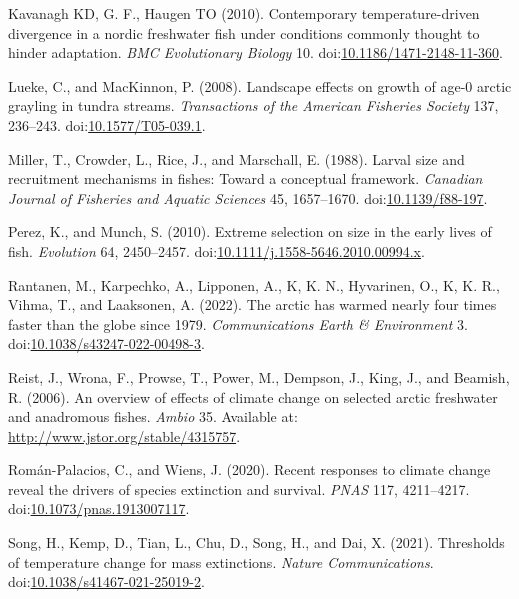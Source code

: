 \documentclass[utf8]{frontiersSCNS}
\newlength{\cslhangindent}
\newlength{\cslentryspacingunit} %
\newenvironment{CSLReferences}[2] %
 {%
  \setlength{\parindent}{0pt}
  \ifodd #1
  \let\oldpar\par
  \def\par{\hangindent=\cslhangindent\oldpar}
  \fi
  \setlength{\parskip}{#2\cslentryspacingunit}
 }%
 {}
\begin{document}
\begin{CSLReferences}{1}{0}
\leavevmode{}%
Kavanagh KD, G. F., Haugen TO (2010). Contemporary temperature-driven
divergence in a nordic freshwater fish under conditions commonly thought
to hinder adaptation. \emph{BMC Evolutionary Biology} 10.
doi:\href{https://doi.org/10.1186/1471-2148-11-360}{10.1186/1471-2148-11-360}.

\leavevmode{}%
Lueke, C., and MacKinnon, P. (2008). Landscape effects on growth of
age-0 arctic grayling in tundra streams. \emph{Transactions of the
American Fisheries Society} 137, 236--243.
doi:\href{https://doi.org/10.1577/T05-039.1}{10.1577/T05-039.1}.

\leavevmode{}%
Miller, T., Crowder, L., Rice, J., and Marschall, E. (1988). Larval size
and recruitment mechanisms in fishes: Toward a conceptual framework.
\emph{Canadian Journal of Fisheries and Aquatic Sciences} 45,
1657--1670. doi:\href{https://doi.org/10.1139/f88-197}{10.1139/f88-197}.

\leavevmode{}%
Perez, K., and Munch, S. (2010). Extreme selection on size in the early
lives of fish. \emph{Evolution} 64, 2450--2457.
doi:\href{https://doi.org/10.1111/j.1558-5646.2010.00994.x}{10.1111/j.1558-5646.2010.00994.x}.

\leavevmode{}%
Rantanen, M., Karpechko, A., Lipponen, A., K, K. N., Hyvarinen, O., K,
K. R., Vihma, T., and Laaksonen, A. (2022). The arctic has warmed nearly
four times faster than the globe since 1979. \emph{Communications Earth
\& Environment} 3.
doi:\href{https://doi.org/10.1038/s43247-022-00498-3}{10.1038/s43247-022-00498-3}.

\leavevmode{}%
Reist, J., Wrona, F., Prowse, T., Power, M., Dempson, J., King, J., and
Beamish, R. (2006). An overview of effects of climate change on selected
arctic freshwater and anadromous fishes. \emph{Ambio} 35. Available at:
\url{http://www.jstor.org/stable/4315757}.

\leavevmode{}%
Román-Palacios, C., and Wiens, J. (2020). Recent responses to climate
change reveal the drivers of species extinction and survival.
\emph{PNAS} 117, 4211--4217.
doi:\href{https://doi.org/10.1073/pnas.1913007117}{10.1073/pnas.1913007117}.

\leavevmode{}%
Song, H., Kemp, D., Tian, L., Chu, D., Song, H., and Dai, X. (2021).
Thresholds of temperature change for mass extinctions. \emph{Nature
Communications}.
doi:\href{https://doi.org/10.1038/s41467-021-25019-2}{10.1038/s41467-021-25019-2}.


\end{CSLReferences}
\end{document}
